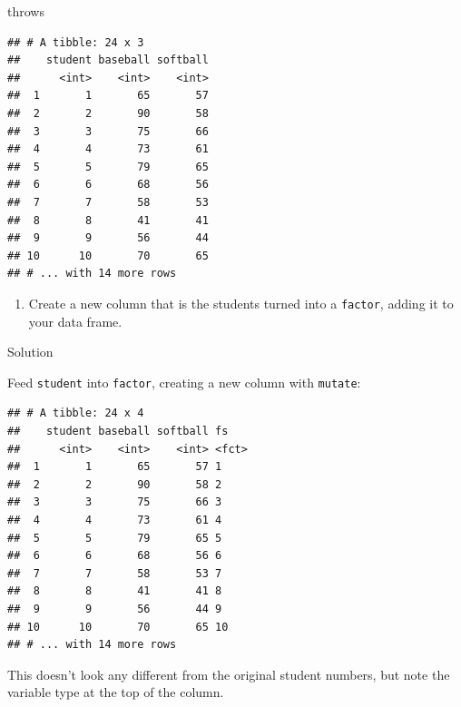 \documentclass[]{tufte-book}
\newenvironment{Shaded}{}{}
\newcommand{\DataTypeTok}[1]{\textcolor[rgb]{0.56,0.13,0.00}{#1}}
\newcommand{\KeywordTok}[1]{\textcolor[rgb]{0.00,0.44,0.13}{\textbf{#1}}}
\newcommand{\NormalTok}[1]{#1}
\newcommand{\OperatorTok}[1]{\textcolor[rgb]{0.40,0.40,0.40}{#1}}
\newcommand{\StringTok}[1]{\textcolor[rgb]{0.25,0.44,0.63}{#1}}
\providecommand{\tightlist}{%
  \setlength{\itemsep}{0pt}\setlength{\parskip}{0pt}}
\theoremstyle{definition}
\theoremstyle{definition}
\theoremstyle{definition}
\theoremstyle{remark}
\begin{document}
\begin{Shaded}
\begin{Highlighting}[]
\NormalTok{throws}
\end{Highlighting}
\end{Shaded}

\begin{verbatim}
## # A tibble: 24 x 3
##    student baseball softball
##      <int>    <int>    <int>
##  1       1       65       57
##  2       2       90       58
##  3       3       75       66
##  4       4       73       61
##  5       5       79       65
##  6       6       68       56
##  7       7       58       53
##  8       8       41       41
##  9       9       56       44
## 10      10       70       65
## # ... with 14 more rows
\end{verbatim}

\begin{enumerate}
\def\labelenumi{(\alph{enumi})}
\setcounter{enumi}{1}
\tightlist
\item
  Create a new column that is the students turned into a
  \texttt{factor}, adding it to your data frame.
\end{enumerate}

Solution

Feed \texttt{student} into \texttt{factor}, creating a new column with
\texttt{mutate}:

\begin{Shaded}
\end{Shaded}

\begin{verbatim}
## # A tibble: 24 x 4
##    student baseball softball fs   
##      <int>    <int>    <int> <fct>
##  1       1       65       57 1    
##  2       2       90       58 2    
##  3       3       75       66 3    
##  4       4       73       61 4    
##  5       5       79       65 5    
##  6       6       68       56 6    
##  7       7       58       53 7    
##  8       8       41       41 8    
##  9       9       56       44 9    
## 10      10       70       65 10   
## # ... with 14 more rows
\end{verbatim}

This doesn't look any different from the original student numbers, but
note the variable type at the top of the column.
\end{document}

